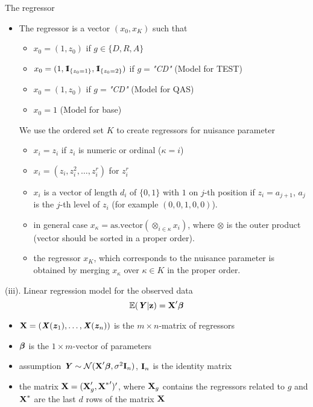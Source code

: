 \documentclass[11pt]{article}
\begin{document}
The regressor\vspace{-2mm}
\begin{itemize}
\setlength\itemsep{-0.3em}
\item[]
The regressor is a vector $(x_0,x_{K})$ such that \vspace{-2mm}
\begin{itemize}
\setlength\itemsep{-0.3em}
\item[]
$x_0=(1,z_0)$ if  $g\in\{D,R,A\}$
\item[]
$x_0=(1,\indi_{\{z_0=1\}},\indi_{\{z_0=2\}})$ if  $g=${\it "CD"}   (Model for TEST)
\item[]
$x_0=(1,z_0)$ if  $g=${\it "CD"}   (Model for QAS)
\item[]
$x_0=1$ (Model for base)
\end{itemize}
We use the ordered set $K$ to create regressors for nuisance parameter \vspace{-2mm}
\begin{itemize}
\setlength\itemsep{-0.3em}
\item[]
$x_i=z_i$ if $z_i$ is numeric or ordinal ($\kappa=i$)
\item[]
$x_i=(z_i,z_i^2,\ldots,z_i^r)$ for $z_i^r$ 
\item[]
$x_i$ is a vector of length $d_i$ of $\{0,1\}$ with $1$ on $j$-th position if $z_i=a_{j+1}$, $a_j$ is the $j$-th level of $z_i$ (for example $(0,0,1,0,0)$). 
\item[]
in general case $ x_{\kappa}=\mbox{as.vector}(\otimes_{i\in\kappa} x_i)$, where $\otimes$ is the outer product (vector should be sorted in a proper order). 
\item[]
the regressor $x_{K}$, which corresponds to the nuisance parameter is obtained by merging $x_{\kappa}$ over $\kappa\in K$ in the proper order. 
\end{itemize}
\end{itemize}
(iii). Linear regression model for the observed data
$$
\E(\Ybi|\zb)=\Xb'\betab
\vspace{-3mm}
$$
\begin{itemize}
\setlength\itemsep{-0.3em}
\item[]
$\mbox{\bf X}=(\mbox{\textbf{\textit X}}(\mbox{\textbf{\textit z}}_1),\ldots,\mbox{\textbf{\textit X}}(\mbox{\textbf{\textit z}}_n))$ is the $m\times n$-matrix of regressors
\item[]
${\boldsymbol \beta}$ is the $1\times m$-vector of parameters
\item[]
assumption $\mbox{\textbf{\textit Y}}\sim {\cal N}(\mbox{\bf X}'{\boldsymbol \beta},\sigma^2 \mbox{\bf I}_n)$, $\mbox{\bf I}_n$ is the identity matrix 
\item[]
the matrix $\mbox{\bf X}=(\mbox{\bf X}'_g,{\mbox{\bf X}^*}')'$, where $\mbox{\bf X}_g$ contains the regressors related to $g$ and $\mbox{\bf X}^*$ are the last $d$ rows of the matrix $\mbox{\bf X}$
\end{itemize}
\end{document}
